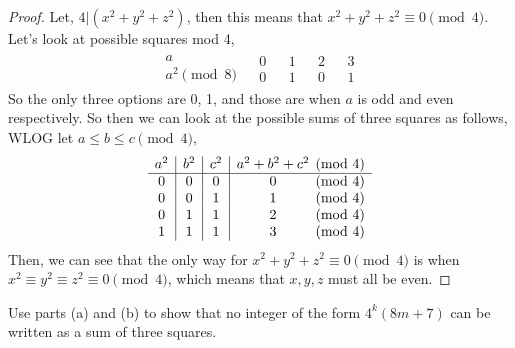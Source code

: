 \documentclass[11pt]{article}
\newenvironment{problem}[2][Problem]{\begin{trivlist}
\item[\hskip \labelsep {\bfseries #1}\hskip \labelsep {\bfseries #2.}]}{\end{trivlist}}
\begin{document}
\begin{proof}
  Let, $4|(x^2+y^2+z^2)$, then this means that $x^2+y^2+z^2 \equiv 0 \pmod{4}$. Let's look at possible squares mod 4,
  \[\begin{array}{c||c|c|c|c}
      \begin{matrix}
        a \\
        \hline
        a^2 \pmod{8}
      \end{matrix}
                     &
      \begin{matrix}
        0 \\
        \hline
        0
      \end{matrix} &
      \begin{matrix}
        1 \\
        \hline
        1
      \end{matrix} &
      \begin{matrix}
        2 \\
        \hline
        0
      \end{matrix} &
      \begin{matrix}
        3 \\
        \hline
        1
      \end{matrix}
    \end{array}\]
  So the only three options are 0, 1, and those are when $a$ is odd and even respectively. So then we can look at the possible sums of three squares as follows, WLOG let $a\leq b\leq c \pmod{4}$,
  \[
    \begin{array}{c|c|c| c@{}c}
      a^2 & b^2 & c^2 & a^2 + b^2 + c^2 & \pmod{4} \\
      \hline
      0   & 0   & 0   & 0               & \pmod{4} \\
      0   & 0   & 1   & 1               & \pmod{4} \\
      0   & 1   & 1   & 2               & \pmod{4} \\
      1   & 1   & 1   & 3               & \pmod{4} \\
    \end{array}
  \]
  Then, we can see that the only way for $x^2+y^2+z^2\equiv 0 \pmod{4}$ is when $x^2\equiv y^2\equiv z^2\equiv 0 \pmod{4}$, which means that $x,y,z$ must all be even.
\end{proof}


\begin{problem}{(c)}
Use parts (a) and (b) to show that no integer of the form $4^k(8m+7)$ can be written as a sum of three squares.
\end{problem}
\end{document}
